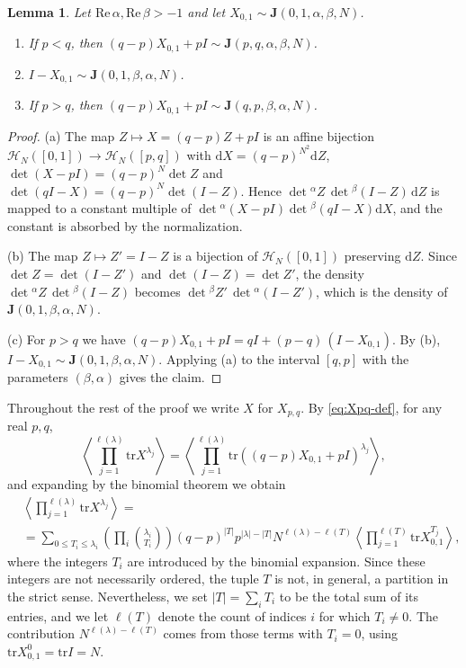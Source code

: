 \documentclass{article}
\newcommand{\tr}{\mathrm{tr}}
\newcommand{\dif}{\mathrm{d}}
\theoremstyle{plain}
\newtheorem{lemma}[thm]{Lemma}
\theoremstyle{definition}
\numberwithin{equation}{section}
\begin{document}
\begin{lemma}
\label{lem:affine}
Let $\mathrm{Re}\,\alpha,\mathrm{Re}\,\beta>-1$ and let $X_{0,1}\sim\mathbf J(0,1,\alpha,\beta,N)$.
\begin{enumerate}
    \item[(a)] If $p<q$, then $(q-p)X_{0,1}+pI\sim\mathbf J(p,q,\alpha,\beta,N)$.
    \item[(b)] $I-X_{0,1}\sim\mathbf J(0,1,\beta,\alpha,N)$.
    \item[(c)] If $p>q$, then $(q-p)X_{0,1}+pI\sim\mathbf J(q,p,\beta,\alpha,N)$.
\end{enumerate}
\end{lemma}
\begin{proof}
(a) The map $Z\mapsto X=(q-p)Z+pI$ is an affine bijection $\mathcal H_N([0,1])\to\mathcal H_N([p,q])$ with $\dif X=(q-p)^{N^2}\dif Z$, $\det(X-pI)=(q-p)^N\det Z$ and $\det(qI-X)=(q-p)^N\det(I-Z)$. Hence
$\det{}^\alpha Z\,\det{}^\beta(I-Z)\,\dif Z$ is mapped to a constant multiple of $\det{}^\alpha(X-pI)\det{}^\beta(qI-X)\dif X$, and the constant is absorbed by the normalization.

(b) The map $Z\mapsto Z'=I-Z$ is a bijection of $\mathcal H_N([0,1])$ preserving $\dif Z$. Since $\det Z=\det(I-Z')$ and $\det(I-Z)=\det Z'$, the density $\det{}^\alpha Z\,\det{}^\beta(I-Z)$ becomes $\det{}^\beta Z'\,\det{}^\alpha(I-Z')$, which is the density of $\mathbf J(0,1,\beta,\alpha,N)$.

(c) For $p>q$ we have $(q-p)X_{0,1}+pI=qI+(p-q)\,(I-X_{0,1})$. By (b), $I-X_{0,1}\sim\mathbf J(0,1,\beta,\alpha,N)$. Applying (a) to the interval $[q,p]$ with the parameters $(\beta,\alpha)$ gives the claim.
\end{proof}

Throughout the rest of the proof we write $X$ for $X_{p,q}$. By \eqref{eq:Xpq-def}, for any real $p,q$,
\begin{equation}
\left\langle \prod_{j=1}^{\ell(\lambda)} \tr X^{\lambda_{j}} \right\rangle = \left\langle \prod_{j=1}^{\ell(\lambda)} \tr \left((q-p)X_{0,1} + pI\right)^{\lambda_{j}} \right\rangle ,
\end{equation}
and expanding by the binomial theorem we obtain
\begin{equation}        \label{eq:Ti_appear}
    \begin{aligned}
        & \left\langle \prod_{j=1}^{\ell(\lambda)} \tr X^{\lambda_{j}} \right\rangle = \\
        & = \sum_{0 \le T_{i} \le \lambda_{i}} \left(\prod_{i} \binom{\lambda_{i}}{T_{i}} \right) (q-p)^{|T|} p^{|\lambda|-|T|} N^{\ell(\lambda) - \ell(T)} \left\langle \prod_{j=1}^{\ell(T)} \tr X^{T_{j}}_{0,1} \right\rangle,
    \end{aligned}
\end{equation}
where the integers $T_i$ are introduced by the binomial expansion. Since these integers are not necessarily ordered, the tuple $T$ is not, in general, a partition in the strict sense. Nevertheless, we set $|T|=\sum_i T_i$ to be the total sum of its entries, and we let $\ell(T)$ denote the count of indices $i$ for which $T_i\neq 0$. The contribution $N^{\ell(\lambda)-\ell(T)}$ comes from those terms with $T_i=0$, using $\tr X_{0,1}^0=\tr I = N$.
\end{document}
